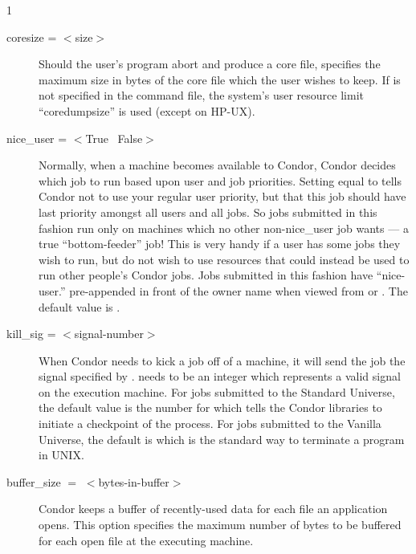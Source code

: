 \begin{ManPage}{\label{man-condor-submit}}{1}
\begin{description}

\item[coresize = $<$size$>$] Should the user's program abort and produce
a core file,  specifies the maximum size in bytes of the
core file which the user wishes to keep. If  is not
specified in the command file, the system's user resource limit
\mbox{``coredumpsize''} is used (except on HP-UX). 


\item[nice\_user = $<$True \Bar\ False$>$] \label{man-condor-submit-nice}Normally, when a machine
becomes available to Condor, Condor decides which job to run based upon
user and job priorities. Setting  equal to 
tells Condor not to use your regular user priority, but that this job
should have last priority amongst all users and all jobs. So jobs
submitted in this fashion run only on machines which no other
non-nice\_user job wants --- a true ``bottom-feeder'' job! This is very
handy if a user has some jobs they wish to run, but do not wish to use
resources that could instead be used to run other people's Condor jobs. Jobs
submitted in this fashion have ``nice-user.'' pre-appended in front of
the owner name when viewed from  or .  The
default value is .


\item[kill\_sig = $<$signal-number$>$] When Condor needs to kick a job
off of a machine, it will send the job the signal specified by
.   needs to be an integer which
represents a valid signal on the execution machine.  For jobs submitted
to the Standard Universe, the default value is the number for
\verb@SIGTSTP@ which tells the Condor libraries to initiate a checkpoint
of the process.  For jobs submitted to the Vanilla Universe, the default 
is \verb@SIGTERM@ which is the standard way to terminate a program in UNIX.  


\item[buffer\_size $=$ $<$bytes-in-buffer$>$]
Condor keeps a buffer of recently-used data for each file an
application opens.  This option specifies the maximum
number of bytes to be buffered for each open file at the executing machine.


\end{description}
\end{ManPage}
